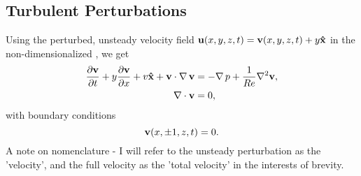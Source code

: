 \subsection{Turbulent Perturbations}
Using the perturbed, unsteady velocity field $\mathbf{u}(x,y,z,t) = \mathbf{v} (x,y,z,t)+ y\mathbf{\hat{x}}$ in the non-dimensionalized , we get 
\begin{align}
\pder{1}{\Vector{v}}{t} + y\pder{1}{\Vector{v}}{x} + v\Vector{\hat{x}} + \Vector{v}\cdot\Grad{\Vector{v}} &= -\Grad{p} + \frac{1}{\ReN} \nabla^2\Vector{v},\\
\Div{\Vector{v}} &= 0,
\end{align}
with boundary conditions 
\begin{equation}
\mathbf{v}(x,\pm 1,z,t) = 0.
\end{equation}
A note on nomenclature - I will refer to the unsteady perturbation as the 'velocity', and the full velocity as the 'total velocity' in the interests of brevity. 
